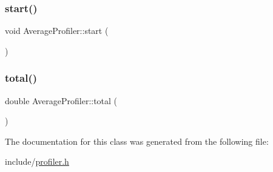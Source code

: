 \subsubsection{\texorpdfstring{start()}{start()}}
{\footnotesize\ttfamily void Average\+Profiler\+::start (\begin{DoxyParamCaption}{ }\end{DoxyParamCaption})\hspace{0.3cm}{\ttfamily [inline]}}

\mbox{\label{class_average_profiler_a14a00487f5dbaf642e57afc4c8c79540}} 
\subsubsection{\texorpdfstring{total()}{total()}}
{\footnotesize\ttfamily double Average\+Profiler\+::total (\begin{DoxyParamCaption}{ }\end{DoxyParamCaption})\hspace{0.3cm}{\ttfamily [inline]}}



The documentation for this class was generated from the following file\+:\begin{DoxyCompactItemize}
\item 
include/\mbox{\hyperlink{profiler_8h}{profiler.\+h}}\end{DoxyCompactItemize}
